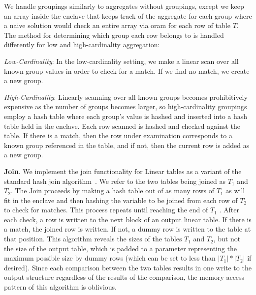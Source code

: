 \documentclass[letterpaper,twocolumn,10pt]{article}
\begin{document}
We handle groupings similarly to aggregates without groupings, except we keep an array inside the enclave that keeps track of the aggregate for each group where a naive solution would check an entire array via oram for each row of table $T$. The method for determining which group each row belongs to is handled differently for low and high-cardinality aggregation:

\textit{Low-Cardinality}: In the low-cardinality setting, we make a linear scan over all known group values in order to check for a match. If we find no match, we create a new group.

\textit{High-Cardinality}: Linearly scanning over all known groups becomes prohibitively expensive as the number of groups becomes larger, so high-cardinality groupings employ a hash table where each group's value is hashed and inserted into a hash table held in the enclave. Each row scanned is hashed and checked against the table. If there is a match, then the row under examination corresponds to a known group referenced in the table, and if not, then the current row is added as a new group.


  \noindent \textbf{Join}.
We implement the join functionality for Linear tables as a variant of the standard hash join algorithm~\cite{EN10}. We refer to the two tables being joined as $T_1$ and $T_2$. The Join proceeds by making a hash table out of as many rows of $T_1$ as will fit in the enclave and then hashing the variable to be joined from each row of $T_2$ to check for matches. This process repeats until reaching the end of $T_1$ . After each check, a row is written to the next block of an output linear table. If there is a match, the joined row is written. If not, a dummy row is written to the table at that position. This algorithm reveals the sizes of the tables $T_1$ and $T_2$, but not the size of the output table, which is padded to a parameter representing the maximum possible size by dummy rows (which can be set to less than $|T_1|*|T_2|$ if desired). Since each comparison between the two tables results in one write to the output structure regardless of the results of the comparison, the memory access pattern of this algorithm is oblivious.
\end{document}
